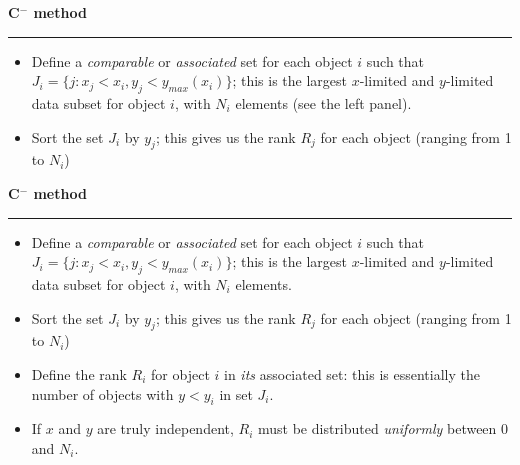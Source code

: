 \documentclass[letterpaper,landscape]{slides}
\begin{document}
\begin{slide}
\begin{center}
\bfseries
{\large {\color{red} C$^-$ method}}
\end{center}
\vskip 0.2in
\hrule

\begin{itemize}
\item 
Define a {\it comparable} or {\it associated} set for each object $i$ such that 
$J_i = \{ j:x_j < x_i, y_j < y_{max}(x_i)\}$; this is the largest $x$-limited and $y$-limited data 
subset for object $i$, with $N_i$ elements (see the left panel).
\item Sort the set $J_i$ by $y_j$; this gives us the rank $R_j$ for each object (ranging
from 1 to $N_i$)
\end{itemize}

\vskip -0.7in
\phantom{x}

\vfill
\end{slide}
 

\begin{slide}
\begin{center}
\bfseries
{\large {\color{red} C$^-$ method}}
\end{center}
\vskip 0.2in
\hrule

\begin{itemize}
\item 
Define a {\it comparable} or {\it associated} set for each object $i$ such that 
$J_i = \{ j:x_j < x_i, y_j < y_{max}(x_i)\}$; this is the largest $x$-limited and $y$-limited data 
subset for object $i$, with $N_i$ elements.
\item Sort the set $J_i$ by $y_j$; this gives us the rank $R_j$ for each object (ranging
from 1 to $N_i$)
\item Define the rank $R_i$ for object $i$ in {\it its} associated set: this is 
essentially the number of objects with $y<y_i$ in set $J_i$.
\item If $x$ and $y$ are truly independent, $R_i$ must be distributed 
      {\it uniformly} between 0 and $N_i$. 
\end{itemize}

\vskip -0.7in
\phantom{x}

\vfill
\end{slide}
 
\end{document}
